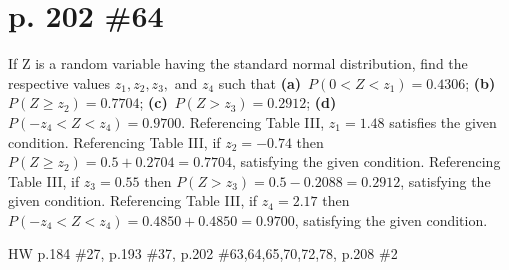 \documentclass[12pt]{article}
\begin{document}
	\section[20pt]{p. 202 \#64}
	If Z is a random variable having the standard normal distribution, find the respective values \(z_1,z_2,z_3,\) and \(z_4\) such that \newline
	\textbf{(a)}\ \(P(0<Z<z_1)=0.4306\); \newline
	\textbf{(b)}\ \(P(Z\geq z_2)=0.7704\); \newline
	\textbf{(c)}\ \(P(Z>z_3)=0.2912\); \newline
	\textbf{(d)}\ \(P(-z_4<Z<z_4)=0.9700\). \newline
	\newline
	Referencing Table III, \(z_1=1.48\) satisfies the given condition. \newline
	 \newline \newline
	Referencing Table III, if \(z_2=-0.74\) then \(P(Z\geq z_2)=0.5+0.2704=0.7704\), satisfying the given condition.
	\newline
	 \newline \newline
	Referencing Table III, if \(z_3=0.55\) then \(P(Z> z_3)=0.5-0.2088=0.2912\), satisfying the given condition.
	\newline
	 \newline \newline
	Referencing Table III, if \(z_4=2.17\) then \(P(-z_4<Z<z_4)=0.4850+0.4850=0.9700\), satisfying the given condition.
	\newline
	\newpage
	\maketitle HW p.184 \#27, p.193 \#37, p.202 \#63,64,65,70,72,78, p.208 \#2
\end{document}
